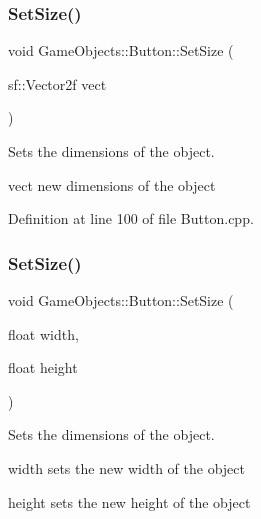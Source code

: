 \subsubsection{\texorpdfstring{SetSize()}{SetSize()}\hspace{0.1cm}{\footnotesize\ttfamily [1/2]}}
{\footnotesize\ttfamily void Game\+Objects\+::\+Button\+::\+Set\+Size (\begin{DoxyParamCaption}\item[{sf\+::\+Vector2f}]{vect }\end{DoxyParamCaption})}



Sets the dimensions of the object. 

vect new dimensions of the object \begin{DoxyVerb}\end{DoxyVerb}
 

Definition at line 100 of file Button.\+cpp.


\begin{DoxyCode}{0}

\end{DoxyCode}
\mbox{\label{class_game_objects_1_1_button_ad5379c5d7415a8bdfc27826e06024dcb}} 
\subsubsection{\texorpdfstring{SetSize()}{SetSize()}\hspace{0.1cm}{\footnotesize\ttfamily [2/2]}}
{\footnotesize\ttfamily void Game\+Objects\+::\+Button\+::\+Set\+Size (\begin{DoxyParamCaption}\item[{float}]{width,  }\item[{float}]{height }\end{DoxyParamCaption})}



Sets the dimensions of the object. 

width sets the new width of the object

height sets the new height of the object \begin{DoxyVerb}\end{DoxyVerb}
 

